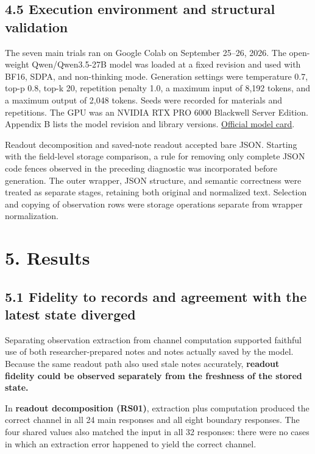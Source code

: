 \documentclass[10pt,a4paper]{article}
\begin{document}
\subsection{4.5 Execution environment and structural validation}\label{paper-02-execution-environment-and-structural-validation}

The seven main trials ran on Google Colab on September 25--26, 2026. The open-weight Qwen/Qwen3.5-27B model was loaded at a fixed revision and used with BF16, SDPA, and non-thinking mode. Generation settings were temperature 0.7, top-p 0.8, top-k 20, repetition penalty 1.0, a maximum input of 8,192 tokens, and a maximum output of 2,048 tokens. Seeds were recorded for materials and repetitions. The GPU was an NVIDIA RTX PRO 6000 Blackwell Server Edition. Appendix B lists the model revision and library versions. \href{https://huggingface.co/Qwen/Qwen3.5-27B}{Official model card}.

Readout decomposition and saved-note readout accepted bare JSON. Starting with the field-level storage comparison, a rule for removing only complete JSON code fences observed in the preceding diagnostic was incorporated before generation. The outer wrapper, JSON structure, and semantic correctness were treated as separate stages, retaining both original and normalized text. Selection and copying of observation rows were storage operations separate from wrapper normalization.

\section{5. Results}\label{paper-02-results}

\subsection{5.1 Fidelity to records and agreement with the latest state diverged}\label{paper-02-fidelity-to-records-and-agreement-with-the-latest-state-diverged}

Separating observation extraction from channel computation supported faithful use of both researcher-prepared notes and notes actually saved by the model. Because the same readout path also used stale notes accurately, \textbf{readout fidelity could be observed separately from the freshness of the stored state.}

In \textbf{readout decomposition (RS01)}, extraction plus computation produced the correct channel in all 24 main responses and all eight boundary responses. The four shared values also matched the input in all 32 responses: there were no cases in which an extraction error happened to yield the correct channel.
\end{document}
